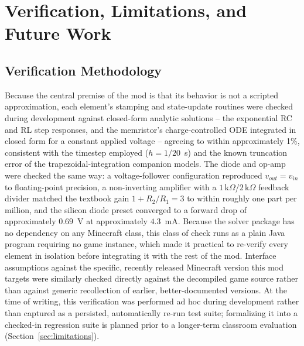 \section{Verification, Limitations, and Future Work}

\subsection{Verification Methodology}
\label{sec:validation}

Because the central premise of the mod is that its behavior is not a scripted
approximation, each element's stamping and state-update routines were checked during
development against closed-form analytic solutions -- the exponential RC and RL step
responses, and the memristor's charge-controlled ODE integrated in closed form for a
constant applied voltage -- agreeing to within approximately 1\%, consistent with the
timestep employed ($h=1/20$~s) and the known truncation error of the trapezoidal-integration
companion models. The diode and op-amp were checked the same way: a voltage-follower
configuration reproduced $v_{out}=v_{in}$ to floating-point precision, a non-inverting
amplifier with a $1\,\mathrm{k}\Omega$/$2\,\mathrm{k}\Omega$ feedback divider matched the
textbook gain $1+R_2/R_1=3$ to within roughly one part per million, and the silicon diode
preset converged to a forward drop of approximately $0.69$~V at approximately $4.3$~mA.
Because the solver package has no dependency on any Minecraft class, this class of check runs
as a plain Java program requiring no game instance, which made it practical to re-verify every
element in isolation before integrating it with the rest of the mod. Interface assumptions
against the specific, recently released Minecraft version this mod targets were similarly
checked directly against the decompiled game source rather than against generic recollection
of earlier, better-documented versions. At the time of writing, this verification was
performed ad hoc during development rather than captured as a persisted, automatically
re-run test suite; formalizing it into a checked-in regression suite is planned prior to a
longer-term classroom evaluation (Section~\ref{sec:limitations}).
